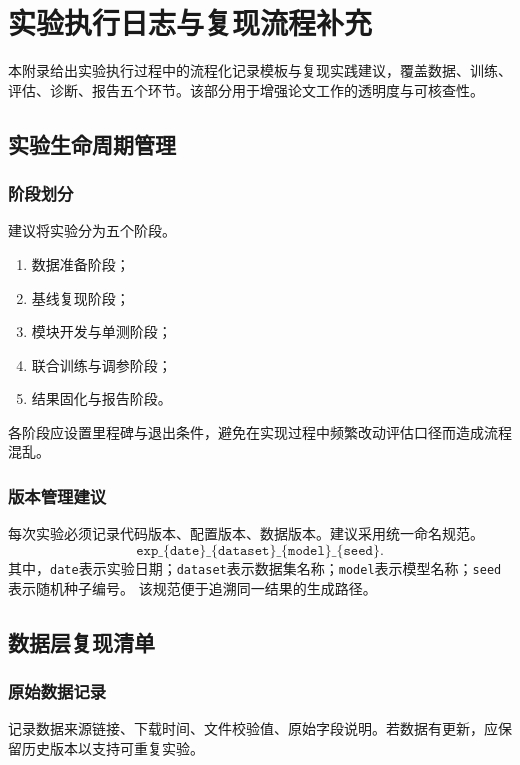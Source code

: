 \chapter{实验执行日志与复现流程补充}
\label{appx:protocol}

本附录给出实验执行过程中的流程化记录模板与复现实践建议，覆盖数据、训练、评估、诊断、报告五个环节。该部分用于增强论文工作的透明度与可核查性。

\section{实验生命周期管理}
\subsection{阶段划分}
建议将实验分为五个阶段。
\begin{enumerate}
    \item 数据准备阶段；
    \item 基线复现阶段；
    \item 模块开发与单测阶段；
    \item 联合训练与调参阶段；
    \item 结果固化与报告阶段。
\end{enumerate}
\par\indent 各阶段应设置里程碑与退出条件，避免在实现过程中频繁改动评估口径而造成流程混乱。

\subsection{版本管理建议}
每次实验必须记录代码版本、配置版本、数据版本。建议采用统一命名规范。
\begin{equation}
\texttt{exp\_\{date\}\_\{dataset\}\_\{model\}\_\{seed\}}.
\end{equation}
其中，\texttt{date}表示实验日期；\texttt{dataset}表示数据集名称；\texttt{model}表示模型名称；\texttt{seed}表示随机种子编号。
该规范便于追溯同一结果的生成路径。

\section{数据层复现清单}
\subsection{原始数据记录}
记录数据来源链接、下载时间、文件校验值、原始字段说明。若数据有更新，应保留历史版本以支持可重复实验。

